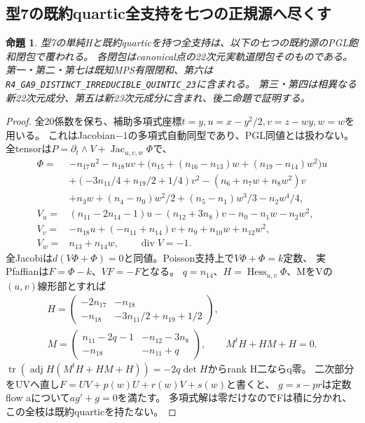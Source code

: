 \documentclass[a4paper,11pt]{ltjsarticle}
\newtheorem{proposition}{命題}[section]
\theoremstyle{definition}
\begin{document}
\subsection{型7の既約quartic全支持を七つの正規源へ尽くす}
\begin{proposition}\label{prop:nil22-long-quartic-seven}
型7の単純Hと既約quarticを持つ全支持は、以下の七つの既約源のPGL飽和閉包で覆われる。
各閉包はcanonical点の22次元実軌道閉包そのものである。
第一・第二・第七は既知MPS有限閉和、第六は
\texttt{R4\_GA9\_DISTINCT\_IRREDUCIBLE\_QUINTIC\_23}に含まれる。
第三・第四は相異なる新22次元成分、第五は新23次元成分に含まれ、後二命題で証明する。
\end{proposition}
\begin{proof}
全20係数を保ち、補助多項式座標$t=y,u=x-y^2/2,v=z-wy,w=w$を用いる。
これはJacobian$-1$の多項式自動同型であり、PGL同値とは扱わない。
全tensorは$P=\partial_t\wedge V+\operatorname{Jac}_{u,v,w}\Phi$で、
\[
\begin{aligned}
 \Phi={}&-n_{17}u^2-n_{18}uv+\bigl(n_{15}+(n_{16}-n_{13})w+(n_{19}-n_{14})w^2\bigr)u\\
 &+(-3n_{11}/4+n_{19}/2+1/4)v^2-(n_6+n_7w+n_8w^2)v\\
 &+n_3w+(n_4-n_0)w^2/2+(n_5-n_1)w^3/3-n_2w^4/4,\\
 V_u={}&(n_{11}-2n_{14}-1)u-(n_{12}+3n_8)v-n_0-n_1w-n_2w^2,\\
 V_v={}&-n_{18}u+(-n_{11}+n_{14})v+n_9+n_{10}w+n_{12}w^2,\\
 V_w={}&n_{13}+n_{14}w,\qquad\operatorname{div}V=-1.
\end{aligned}
\]
全Jacobiは$d(V\Phi+\Phi)=0$と同値。Poisson支持上で$V\Phi+\Phi=k$定数、
実Pfaffianは$F=\Phi-k$、$VF=-F$となる。
$q=n_{14}$、$H=\operatorname{Hess}_{u,v}\Phi$、MをVの$(u,v)$線形部とすれば
\[
\begin{gathered}
 H=\begin{pmatrix}-2n_{17}&-n_{18}\\-n_{18}&-3n_{11}/2+n_{19}+1/2\end{pmatrix},\\
 M=\begin{pmatrix}n_{11}-2q-1&-n_{12}-3n_8\\-n_{18}&-n_{11}+q\end{pmatrix},\qquad M^tH+HM+H=0.
\end{gathered}
\]
$\operatorname{tr}(\operatorname{adj}H(M^tH+HM+H))=-2q\det H$からrank H二ならq零。
二次部分をUVへ直し$F=UV+p(w)U+r(w)V+s(w)$と書くと、
$g=s-pr$は定数flow aについて$ag'+g=0$を満たす。
多項式解は零だけなのでFは積に分かれ、この全枝は既約quarticを持たない。


\end{proof}
\end{document}
